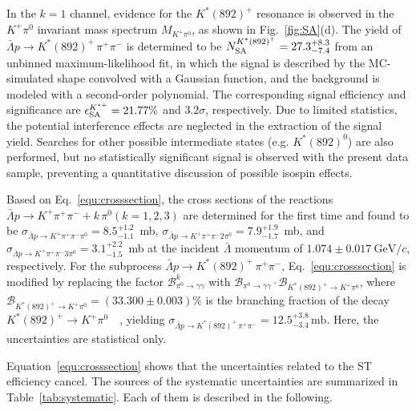 \documentclass[prd,aps,reprint,noeprint,superscriptaddress,amsmath, amssymb]{revtex4-1}
\begin{document}
In the $k=1$ channel, evidence for the $K^{*}(892)^{+}$ resonance is observed in the $K^+\pi^0$ invariant mass spectrum $M_{K^+\pi^0}$,
as shown in Fig.~\ref{fig:SA}(d).
The yield of $\bar{\Lambda} p \to K^{*}(892)^{+}\,\pi^+\pi^-$ is determined to be $N^{K^{*}(892)^{+}}_{\rm SA} = 27.3^{+8.3}_{-7.4}$
from an unbinned maximum-likelihood fit,
in which the signal is described by the MC-simulated shape convolved with a Gaussian function,
and the background is modeled with a second-order polynomial.
The corresponding signal efficiency and significance are $\epsilon^{K^{*+}}_{\rm SA} = 21.77\%$ and $3.2\sigma$, respectively.
Due to limited statistics, the potential interference effects are neglected in the extraction of the signal yield.
Searches for other possible intermediate states (e.g. $K^*(892)^0$) are also performed, but no statistically significant signal is observed with the present data sample, preventing a quantitative discussion of possible isospin effects.

Based on Eq.~\ref{equ:crosssection},
the cross sections of the reactions $\bar{\Lambda} p \to K^+ \pi^+ \pi^- + k\,\pi^0 (k=1,2,3)$
are determined for the first time and found to be $\sigma_{\bar{\Lambda} p \to K^+ \pi^+ \pi^-\pi^0} = 8.5^{+1.2}_{-1.1}$~mb,
$\sigma_{\bar{\Lambda} p \to K^+ \pi^+ \pi^- 2\pi^0} = 7.9^{+1.9}_{-1.7}$~mb,
and $\sigma_{\bar{\Lambda} p \to K^+ \pi^+ \pi^- 3\pi^0} = 3.1^{+2.2}_{-1.5}$~mb
at the incident $\bar{\Lambda}$ momentum of $1.074 \pm 0.017~\mathrm{GeV}/c$, respectively.
For the subprocess $\bar{\Lambda} p \to  K^{*}(892)^{+}\,\pi^+\pi^-$,
Eq.~\ref{equ:crosssection} is modified by replacing the factor ${\mathcal B}^{k}_{\pi^0\to\gamma\gamma}$
with ${\mathcal B}_{\pi^0\to\gamma\gamma}\cdot{\mathcal B}_{ K^{*}(892)^{+}\to K^+\pi^0}$,
where ${\mathcal B}_{K^{*}(892)^{+}\to K^+\pi^0} = (33.300\pm0.003)\%$ is the branching fraction of the decay ${K^{*}(892)^{+}\to K^+\pi^0}$~~\cite{PDG},
yielding $\sigma_{\bar{\Lambda} p \to  K^{*}(892)^{+}\,\pi^+\pi^-} = 12.5^{+3.8}_{-3.4}\,\mathrm{mb}$.
Here, the uncertainties are statistical only.

Equation~\ref{equ:crosssection} shows that the uncertainties related to the ST efficiency cancel.
The sources of the systematic uncertainties are summarized in Table~\ref{tab:systematic}.
Each of them is described in the following.
\end{document}
